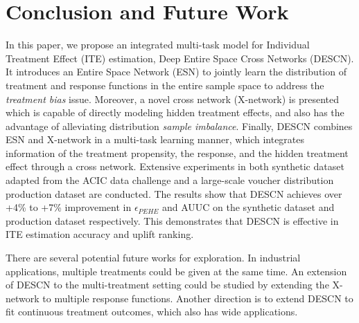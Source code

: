 \documentclass[sigconf]{acmart}
\begin{document}
\section{Conclusion and Future Work}
In this paper, we propose an integrated multi-task model for Individual Treatment Effect (ITE) estimation, Deep Entire Space Cross Networks (DESCN). It introduces an Entire Space Network (ESN) to jointly learn the distribution of treatment and response functions in the entire sample space to address the \textit{treatment bias} issue. Moreover, a novel cross network (X-network) is presented which is capable of directly modeling hidden treatment effects, and also has the advantage of alleviating distribution \textit{sample imbalance}. Finally, DESCN combines ESN and X-network in a multi-task learning manner, which integrates information of the treatment propensity, the response, and the hidden treatment effect through a cross network. Extensive experiments in both synthetic dataset adapted from the ACIC data challenge and a large-scale voucher distribution production dataset are conducted. The results show that DESCN achieves over +4\% to +7\% improvement in $\epsilon_{PEHE}$ and AUUC on the synthetic dataset and production dataset respectively. This demonstrates that DESCN is effective in ITE estimation accuracy and uplift ranking.

There are several potential future works for exploration. In industrial applications, multiple treatments could be given at the same time. An extension of DESCN to the multi-treatment setting could be studied by extending the X-network to multiple response functions. Another direction is to extend DESCN to fit continuous treatment outcomes, which also has wide applications. 








\end{document}
